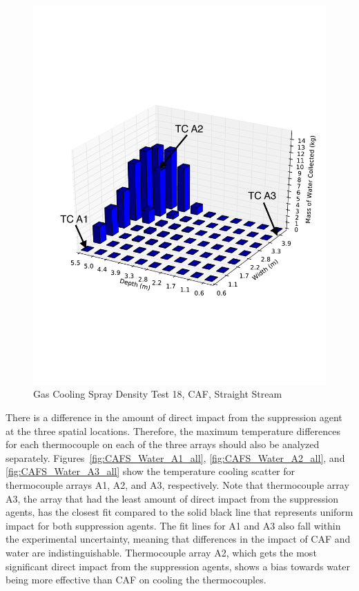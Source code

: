 \documentclass[12pt,oneside]{book}
\begin{document}
\begin{figure}[!ht]
	\includegraphics[width=.7\columnwidth]{../Figures/Bars/BB18b}
	\caption{Gas Cooling Spray Density Test 18, CAF, Straight Stream}
	\label{fig:Burn_Building_Test_18b}
\end{figure}

There is a difference in the amount of direct impact from the suppression agent at the three spatial locations. Therefore, the maximum temperature differences for each thermocouple on each of the three arrays should also be analyzed separately. Figures~\ref{fig:CAFS_Water_A1_all}, \ref{fig:CAFS_Water_A2_all}, and \ref{fig:CAFS_Water_A3_all} show the temperature cooling scatter for thermocouple arrays A1, A2, and A3, respectively. Note that thermocouple array A3, the array that had the least amount of direct impact from the suppression agents, has the closest fit compared to the solid black line that represents uniform impact for both suppression agents. The fit lines for A1 and A3 also fall within the experimental uncertainty, meaning that differences in the impact of CAF and water are indistinguishable. Thermocouple array A2, which gets the most significant direct impact from the suppression agents, shows a bias towards water being more effective than CAF on cooling the thermocouples. 
\end{document}
